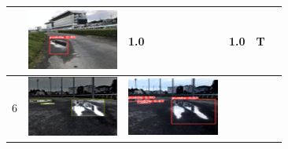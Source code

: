 \documentclass[10pt]{jarticle}
\begin{document}
\begin{table}[H]
\begin{tabular}{|l|l|l|l|l|l|}
\begin{minipage}{.1\textwidth}
           \end{minipage}       & \begin{minipage}{.1\textwidth}
            \centering
            \includegraphics[width=0.9\linewidth]{./fig/tab5_r.png}
           \end{minipage}       & 1.0 & 1.0 & T       \\ \hline
        6  & \begin{minipage}{.1\textwidth}
            \centering
            \includegraphics[width=0.9\linewidth]{./fig/tab6_a.png}
           \end{minipage}       & \begin{minipage}{.1\textwidth}
            \centering
            \includegraphics[width=0.9\linewidth]{./fig/tab6_r.png}

\end{minipage}
\end{tabular}
\end{table}
\end{document}

